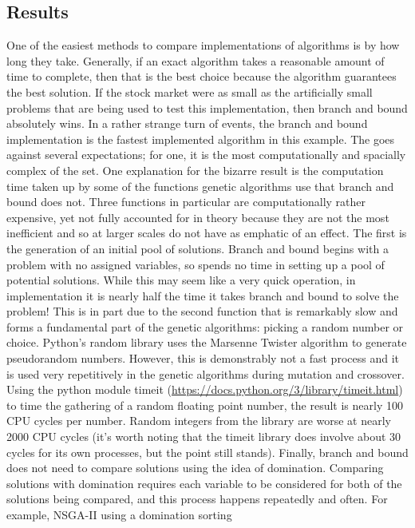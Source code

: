 \documentclass{article}
\begin{document}
    \subsection{Results}
    One of the easiest methods to compare implementations of algorithms is by how long they take. Generally, if an exact algorithm takes a reasonable amount of 
    time to complete, then that is the best choice because the algorithm guarantees the best solution. If the stock market were as small as the artificially small
    problems that are being used to test this implementation, then branch and bound absolutely wins. In a rather strange turn of events, the branch and bound 
    implementation is the fastest implemented algorithm in this example. The goes against several expectations; for one, it is the most computationally and spacially
    complex of the set. One explanation for the bizarre result is the computation time taken up by some of the functions genetic algorithms use that branch and bound
    does not. Three functions in particular are computationally rather expensive, yet not fully accounted for in theory because they are not the most inefficient 
    and so at larger scales do not have as emphatic of an effect. The first is the generation of an initial pool of solutions. Branch and bound begins with a problem 
    with no assigned variables, so spends no time in setting up a pool of potential solutions. While this may seem like a very quick operation, in implementation it is 
    nearly half the time it takes branch and bound to solve the problem! This is in part due to the second function that is remarkably slow and forms a fundamental
    part of the genetic algorithms: picking a random number or choice. Python's random library uses the Marsenne Twister algorithm to generate pseudorandom numbers. 
    However, this is demonstrably not a fast process and it is used very repetitively in the genetic algorithms during mutation and crossover. Using the python module
    timeit (\url{https://docs.python.org/3/library/timeit.html}) to time the gathering of a random floating point number, the result is nearly 100 CPU cycles per number. 
    Random integers from the library are worse at nearly 2000 CPU cycles (it's worth noting that the timeit library does involve about 30 cycles for its own processes,
    but the point still stands). Finally, branch and bound does not need to compare solutions using the idea of domination. Comparing solutions with domination requires
    each variable to be considered for both of the solutions being compared, and this process happens repeatedly and often. For example, NSGA-II using a domination sorting 
\end{document}

